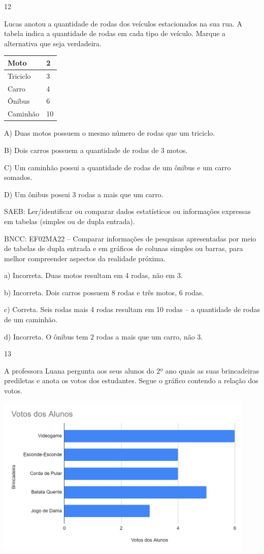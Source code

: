 \begin{escolha}
\begin{escolha}
{{{{\num{12}

Lucas anotou a quantidade de rodas dos veículos estacionados na sua rua.
A tabela indica a quantidade de rodas em cada tipo de veículo. Marque a
alternativa que seja verdadeira.

\begin{longtable}[]{@{}ll@{}}
\toprule
Moto & 2\tabularnewline
\midrule
\endhead
Triciclo & 3\tabularnewline
Carro & 4\tabularnewline
Ônibus & 6\tabularnewline
Caminhão & 10\tabularnewline
\bottomrule
\end{longtable}

A) Duas motos possuem o mesmo número de rodas que um triciclo.

B) Dois carros possuem a quantidade de rodas de 3 motos.

C) Um caminhão possui a quantidade de rodas de um ônibus e um carro
somados.

D) Um ônibus possui 3 rodas a mais que um carro.

SAEB: Ler/identificar ou comparar dados estatísticos ou
informações expressas em tabelas (simples ou de dupla entrada).

BNCC: EF02MA22 -- Comparar informações de pesquisas apresentadas por meio
de tabelas de dupla entrada e em gráficos de colunas simples ou barras,
para melhor compreender aspectos da realidade próxima.

a) Incorreta. Duas motos resultam em 4 rodas, não em 3.

b) Incorreta. Dois carros possuem 8 rodas e três motos, 6 rodas.

c) Correta. Seis rodas mais 4 rodas resultam em 10 rodas -- a quantidade
de rodas de um caminhão.

d) Incorreta. O ônibus tem 2 rodas a mais que um carro, não 3.

\num{13}

A professora Luana pergunta aos seus alunos do 2º ano quais as suas
brincadeiras prediletas e anota os votos dos estudantes. Segue o gráfico
contendo a relação dos votos.

\includegraphics[width=4.88542in,height=3.01579in]{media/image171.png}

}}}}
\end{escolha}
\end{escolha}
